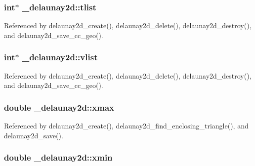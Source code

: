 \subsubsection[{\texorpdfstring{tlist}{tlist}}]{\setlength{\rightskip}{0pt plus 5cm}int$\ast$ \+\_\+delaunay2d\+::tlist}\hypertarget{struct__delaunay2d_afb1ae08fc1d4bfc95c87db7efff82d67}{}\label{struct__delaunay2d_afb1ae08fc1d4bfc95c87db7efff82d67}


Referenced by delaunay2d\+\_\+create(), delaunay2d\+\_\+delete(), delaunay2d\+\_\+destroy(), and delaunay2d\+\_\+save\+\_\+cc\+\_\+geo().

\subsubsection[{\texorpdfstring{vlist}{vlist}}]{\setlength{\rightskip}{0pt plus 5cm}int$\ast$ \+\_\+delaunay2d\+::vlist}\hypertarget{struct__delaunay2d_a427a53f03edcd3a7d411f6985d4bda19}{}\label{struct__delaunay2d_a427a53f03edcd3a7d411f6985d4bda19}


Referenced by delaunay2d\+\_\+create(), delaunay2d\+\_\+delete(), delaunay2d\+\_\+destroy(), and delaunay2d\+\_\+save\+\_\+cc\+\_\+geo().

\subsubsection[{\texorpdfstring{xmax}{xmax}}]{\setlength{\rightskip}{0pt plus 5cm}double \+\_\+delaunay2d\+::xmax}\hypertarget{struct__delaunay2d_aaaf061fa3cd37e06112d371ac51cb45c}{}\label{struct__delaunay2d_aaaf061fa3cd37e06112d371ac51cb45c}


Referenced by delaunay2d\+\_\+create(), delaunay2d\+\_\+find\+\_\+enclosing\+\_\+triangle(), and delaunay2d\+\_\+save().

\subsubsection[{\texorpdfstring{xmin}{xmin}}]{\setlength{\rightskip}{0pt plus 5cm}double \+\_\+delaunay2d\+::xmin}\hypertarget{struct__delaunay2d_acdbdc893ccf7387fa23a4080e81fb9ca}{}\label{struct__delaunay2d_acdbdc893ccf7387fa23a4080e81fb9ca}


